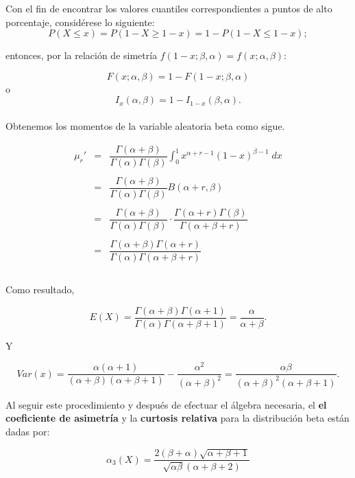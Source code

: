 Con el fin de encontrar los valores cuantiles correspondientes a puntos de alto porcentaje, considérese lo siguiente:
$$P(X\leq x)=P(1-X\geq 1-x)=1-P(1-X\leq 1-x);$$

entonces, por la relación de simetría $f(1-x;\beta,\alpha)=f(x;\alpha,\beta)$:

$$F(x;\alpha,\beta)=1-F(1-x;\beta,\alpha)$$
o
$$I_x(\alpha,\beta)=1-I_{1-x}(\beta,\alpha).$$\\

Obtenemos los momentos de la variable aleatoria beta como sigue.

$$\begin{array}{rcl}
    \mu_r'&=&\dfrac{\Gamma (\alpha+\beta)}{\Gamma (\alpha)\Gamma (\beta)}\displaystyle\int_0^1 x^{\alpha+r-1}(1-x)^{\beta - 1}\; dx\\\\
    &=&\dfrac{\Gamma (\alpha+\beta)}{\Gamma (\alpha)\Gamma (\beta)}B(\alpha+r,\beta)\\\\
    &=&\dfrac{\Gamma (\alpha+\beta)}{\Gamma (\alpha)\Gamma (\beta)}\cdot \dfrac{\Gamma (\alpha + r)\Gamma (\beta)}{\Gamma (\alpha + \beta +r)}\\\\
    &=&\dfrac{\Gamma (\alpha+\beta)\Gamma (\alpha + r)}{\Gamma (\alpha)\Gamma (\alpha + \beta + r)}\\\\
\end{array}$$

Como resultado,

\begin{tcolorbox}
    $$E(X)=\dfrac{\Gamma(\alpha+\beta)\Gamma(\alpha + 1)}{\Gamma (\alpha)\Gamma (\alpha + \beta + 1)}= \dfrac{\alpha}{\alpha+\beta}.$$
\end{tcolorbox}

Y

\begin{tcolorbox}
    $$Var(x)=\dfrac{\alpha(\alpha+1)}{(\alpha+\beta)(\alpha+\beta+1)}-\dfrac{\alpha^2}{(\alpha+\beta)^2}=\dfrac{\alpha \beta}{(\alpha+\beta)^2(\alpha+\beta + 1)}.$$
\end{tcolorbox}

Al seguir este procedimiento y después de efectuar el álgebra necesaria, el \textbf{el coeficiente de asimetría} y la \textbf{curtosis relativa} para la distribución beta están dadas por:

\begin{tcolorbox}
    $$\alpha_3(X)=\dfrac{2(\beta + \alpha)\sqrt{\alpha+\beta+1}}{\sqrt{\alpha \beta}(\alpha+\beta+2)}$$
\end{tcolorbox}

